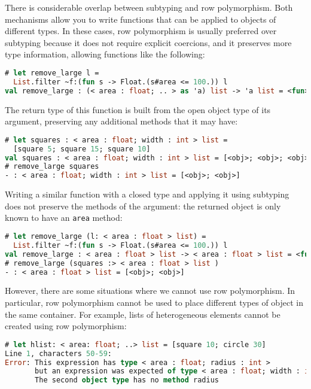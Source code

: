 There is considerable overlap between subtyping and row polymorphism.
Both mechanisms allow you to write functions that can be applied to
objects of different types. In these cases, row polymorphism is usually
preferred over subtyping because it does not require explicit coercions,
and it preserves more type information, allowing functions like the
following: 

\begin{lstlisting}[language=Caml]
# let remove_large l =
  List.filter ~f:(fun s -> Float.(s#area <= 100.)) l
val remove_large : (< area : float; .. > as 'a) list -> 'a list = <fun>
\end{lstlisting}

The return type of this function is built from the open object type of
its argument, preserving any additional methods that it may have:

\begin{lstlisting}[language=Caml]
# let squares : < area : float; width : int > list =
  [square 5; square 15; square 10]
val squares : < area : float; width : int > list = [<obj>; <obj>; <obj>]
# remove_large squares
- : < area : float; width : int > list = [<obj>; <obj>]
\end{lstlisting}

Writing a similar function with a closed type and applying it using
subtyping does not preserve the methods of the argument: the returned
object is only known to have an \passthrough{\lstinline!area!} method:

\begin{lstlisting}[language=Caml]
# let remove_large (l: < area : float > list) =
  List.filter ~f:(fun s -> Float.(s#area <= 100.)) l
val remove_large : < area : float > list -> < area : float > list = <fun>
# remove_large (squares :> < area : float > list )
- : < area : float > list = [<obj>; <obj>]
\end{lstlisting}

However, there are some situations where we cannot use row polymorphism.
In particular, row polymorphism cannot be used to place different types
of object in the same container. For example, lists of heterogeneous
elements cannot be created using row polymorphism:

\begin{lstlisting}[language=Caml]
# let hlist: < area: float; ..> list = [square 10; circle 30]
Line 1, characters 50-59:
Error: This expression has type < area : float; radius : int >
       but an expression was expected of type < area : float; width : int >
       The second object type has no method radius
\end{lstlisting}

